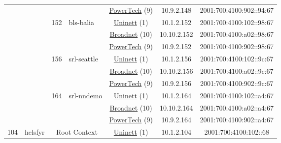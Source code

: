 \begin{small}
\begin{center}
\begin{longtable}{|c|c|c|c|c|c|c|c|}
  &  &  &  & \multicolumn{2}{|c|}{\tiny{\href{http://www.powertech.no}{PowerTech} (9)}} & \tiny{10.9.2.148} & \tiny{2001:700:4100:902::94:67} \\* \cline{3-3}\cline{4-4}\cline{5-5}\cline{6-6}\cline{7-7}\cline{8-8}
  &  & \multirow{3}{*}{\tiny{152}} & \multicolumn{1}{|l|}{\multirow{3}{*}{\tiny{bls-balia}}} & \multicolumn{2}{|c|}{\tiny{\href{https://www.uninett.no}{Uninett} (1)}} & \tiny{10.1.2.152} & \tiny{2001:700:4100:102::98:67} \\* \cline{5-5}\cline{6-6}\cline{7-7}\cline{8-8}
  &  &  &  & \multicolumn{2}{|c|}{\tiny{\href{https://www.broadnet.no}{Broadnet} (10)}} & \tiny{10.10.2.152} & \tiny{2001:700:4100:a02::98:67} \\* \cline{5-5}\cline{6-6}\cline{7-7}\cline{8-8}
  &  &  &  & \multicolumn{2}{|c|}{\tiny{\href{http://www.powertech.no}{PowerTech} (9)}} & \tiny{10.9.2.152} & \tiny{2001:700:4100:902::98:67} \\* \cline{3-3}\cline{4-4}\cline{5-5}\cline{6-6}\cline{7-7}\cline{8-8}
  &  & \multirow{3}{*}{\tiny{156}} & \multicolumn{1}{|l|}{\multirow{3}{*}{\tiny{srl-seattle}}} & \multicolumn{2}{|c|}{\tiny{\href{https://www.uninett.no}{Uninett} (1)}} & \tiny{10.1.2.156} & \tiny{2001:700:4100:102::9c:67} \\* \cline{5-5}\cline{6-6}\cline{7-7}\cline{8-8}
  &  &  &  & \multicolumn{2}{|c|}{\tiny{\href{https://www.broadnet.no}{Broadnet} (10)}} & \tiny{10.10.2.156} & \tiny{2001:700:4100:a02::9c:67} \\* \cline{5-5}\cline{6-6}\cline{7-7}\cline{8-8}
  &  &  &  & \multicolumn{2}{|c|}{\tiny{\href{http://www.powertech.no}{PowerTech} (9)}} & \tiny{10.9.2.156} & \tiny{2001:700:4100:902::9c:67} \\* \cline{3-3}\cline{4-4}\cline{5-5}\cline{6-6}\cline{7-7}\cline{8-8}
  &  & \multirow{3}{*}{\tiny{164}} & \multicolumn{1}{|l|}{\multirow{3}{*}{\tiny{srl-nndemo}}} & \multicolumn{2}{|c|}{\tiny{\href{https://www.uninett.no}{Uninett} (1)}} & \tiny{10.1.2.164} & \tiny{2001:700:4100:102::a4:67} \\* \cline{5-5}\cline{6-6}\cline{7-7}\cline{8-8}
  &  &  &  & \multicolumn{2}{|c|}{\tiny{\href{https://www.broadnet.no}{Broadnet} (10)}} & \tiny{10.10.2.164} & \tiny{2001:700:4100:a02::a4:67} \\* \cline{5-5}\cline{6-6}\cline{7-7}\cline{8-8}
  &  &  &  & \multicolumn{2}{|c|}{\tiny{\href{http://www.powertech.no}{PowerTech} (9)}} & \tiny{10.9.2.164} & \tiny{2001:700:4100:902::a4:67} \\ \hline
 \multirow{21}{*}{\tiny{104}} & \multicolumn{1}{|l|}{\multirow{21}{*}{\tiny{helsfyr}}} & \multicolumn{2}{|c|}{\multirow{3}{*}{\tiny{Root Context}}} & \multicolumn{2}{|c|}{\tiny{\href{https://www.uninett.no}{Uninett} (1)}} & \tiny{10.1.2.104} & \tiny{2001:700:4100:102::68} \\* \cline{5-5}\cline{6-6}\cline{7-7}\cline{8-8}

\end{longtable}
\end{center}
\end{small}
